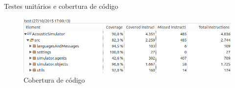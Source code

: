 \begin{frame}{Testes unitários e cobertura de código}

  \begin{figure}[t]
    \centering
    \includegraphics[height=\dimexpr6\textheight/14\relax]{figuras/cobertura}
    \caption{Cobertura de código}
  \end{figure}

\end{frame}

